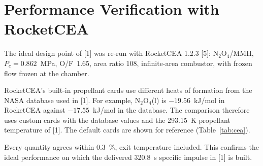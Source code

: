 \documentclass[10pt]{article}
\begin{document}
\section{Performance Verification with RocketCEA}\label{sec:cea}
The ideal design point of [1] was re-run with RocketCEA 1.2.3 [5]: N$_2$O$_4$/MMH, $P_c = 0.862$~MPa, O/F~1.65, area
ratio 108, infinite-area combustor, with frozen flow frozen at the chamber.

RocketCEA's built-in propellant cards use different heats of formation from the NASA database used in [1]. For example,
N$_2$O$_4$(l) is $-19.56$~kJ/mol in RocketCEA against $-17.55$~kJ/mol in the database. The comparison therefore uses
custom cards with the database values and the 293.15~K propellant temperature of [1]. The default cards are shown for
reference (Table~\ref{tab:cea}).

\begin{table}[H]\centering\small\caption{Ideal vacuum performance: analysis solver [1] against RocketCEA.}\label{tab:cea}
\end{table}

Every quantity agrees within 0.3~\%, exit temperature included. This confirms the ideal performance on which the
delivered 320.8~s specific impulse in [1] is built.
\end{document}
